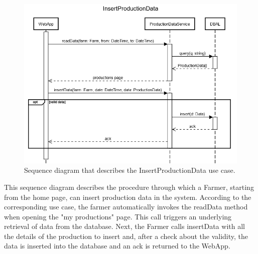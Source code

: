 \documentclass{article}
\begin{document}
\newpage
\begin{figure}[H]
   \centering
   \includegraphics[scale=0.60]{diagrams/sequence diagrams/InsertProductionData.png}
    \caption{Sequence diagram that describes the InsertProductionData use case.}
\end{figure}
This sequence diagram describes the procedure through which a Farmer, starting from the home page, can insert production data in the system. According to the corresponding use case, the farmer automatically invokes the readData method when opening the "my productions" page. This call triggers an underlying retrieval of data from the database. Next, the Farmer calls insertData with all the details of the production to insert and, after a check about the validity, the data is inserted into the database and an ack is returned to the WebApp.
\end{document}
